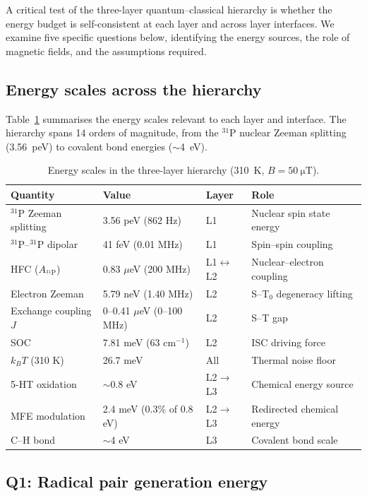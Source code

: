 A critical test of the three-layer quantum--classical hierarchy is whether the energy budget is self-consistent at each layer and across layer interfaces. We examine five specific questions below, identifying the energy sources, the role of magnetic fields, and the assumptions required.

\subsection{Energy scales across the hierarchy}

Table~\ref{tab:energy_budget} summarises the energy scales relevant to each layer and interface. The hierarchy spans 14 orders of magnitude, from the $^{31}$P nuclear Zeeman splitting (3.56~peV) to covalent bond energies ($\sim$4~eV).

\begin{table}[h]
\centering
\caption{Energy scales in the three-layer hierarchy (310~K, $B = 50~\si{\micro\tesla}$).}
\label{tab:energy_budget}
\small
\begin{tabular}{@{}llll@{}}
\toprule
Quantity & Value & Layer & Role \\
\midrule
$^{31}$P Zeeman splitting & 3.56 peV (862 Hz) & L1 & Nuclear spin state energy \\
$^{31}$P--$^{31}$P dipolar & 41 feV (0.01 MHz) & L1 & Spin--spin coupling \\
HFC ($A_{^{31}\mathrm{P}}$) & 0.83 $\mu$eV (200 MHz) & L1$\leftrightarrow$L2 & Nuclear--electron coupling \\
Electron Zeeman & 5.79 neV (1.40 MHz) & L2 & S--T$_0$ degeneracy lifting \\
Exchange coupling $J$ & 0--0.41 $\mu$eV (0--100 MHz) & L2 & S--T gap \\
SOC & 7.81 meV (63 cm$^{-1}$) & L2 & ISC driving force \\
$k_BT$ (310 K) & 26.7 meV & All & Thermal noise floor \\
5-HT oxidation & $\sim$0.8 eV & L2$\to$L3 & Chemical energy source \\
MFE modulation & 2.4 meV (0.3\% of 0.8 eV) & L2$\to$L3 & Redirected chemical energy \\
C--H bond & $\sim$4 eV & L3 & Covalent bond scale \\
\bottomrule
\end{tabular}
\end{table}

\subsection{Q1: Radical pair generation energy}


